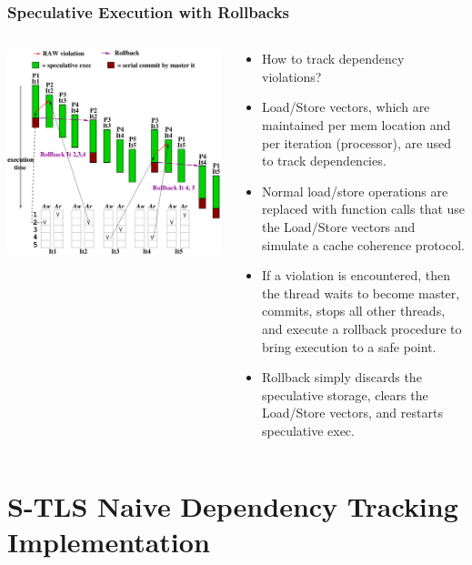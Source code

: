 \documentclass{beamer}
\newcommand{\emp}[1]{\textcolor{DikuRed}{ #1}}
\begin{document}
\begin{frame}[fragile,t]
  \frametitle{Speculative Execution with Rollbacks}

\begin{columns}
\includegraphics[width=47ex]{FigsTLS/Rollback.pdf}\pause
{}
\begin{scriptsize}
\begin{itemize}
\item \emp{How to track dependency violations?}
\item Load/Store vectors, which are maintained per mem location
        and per iteration (processor), are used to track 
        dependencies.
\item Normal load/store operations are replaced with 
        function calls that use the Load/Store vectors 
        and simulate a cache coherence protocol.
\item If a violation is encountered, then the thread
        waits to become master, commits, stops all other threads,
        and execute a \emp{rollback procedure} to bring
        execution to a safe point.
\item Rollback simply discards the speculative storage,
        clears the Load/Store vectors, and restarts
        speculative exec. 
\end{itemize}
\end{scriptsize}
\end{columns}

\end{frame}

\section{S-TLS Naive Dependency Tracking Implementation}
\end{document}

